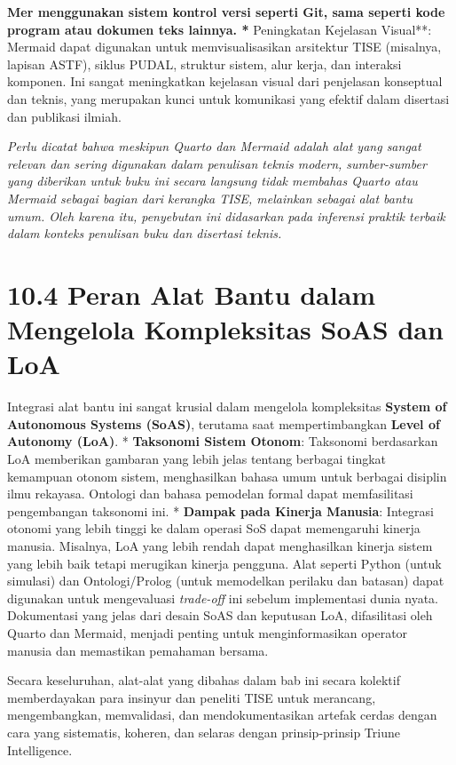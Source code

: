 \documentclass[
  letterpaper,
  DIV=11,
  numbers=noendperiod]{scrreprt}
\begin{document}
\textbf{Mer menggunakan sistem kontrol versi seperti Git, sama seperti
kode program atau dokumen teks lainnya. * }Peningkatan Kejelasan
Visual**: Mermaid dapat digunakan untuk memvisualisasikan arsitektur
TISE (misalnya, lapisan ASTF), siklus PUDAL, struktur sistem, alur
kerja, dan interaksi komponen. Ini sangat meningkatkan kejelasan visual
dari penjelasan konseptual dan teknis, yang merupakan kunci untuk
komunikasi yang efektif dalam disertasi dan publikasi ilmiah.

\emph{Perlu dicatat bahwa meskipun Quarto dan Mermaid adalah alat yang
sangat relevan dan sering digunakan dalam penulisan teknis modern,
sumber-sumber yang diberikan untuk buku ini secara langsung tidak
membahas Quarto atau Mermaid sebagai bagian dari kerangka TISE,
melainkan sebagai alat bantu umum. Oleh karena itu, penyebutan ini
didasarkan pada inferensi praktik terbaik dalam konteks penulisan buku
dan disertasi teknis.}

\section{\texorpdfstring{\textbf{10.4 Peran Alat Bantu dalam Mengelola
Kompleksitas SoAS dan
LoA}}{10.4 Peran Alat Bantu dalam Mengelola Kompleksitas SoAS dan LoA}}\label{peran-alat-bantu-dalam-mengelola-kompleksitas-soas-dan-loa}

Integrasi alat bantu ini sangat krusial dalam mengelola kompleksitas
\textbf{System of Autonomous Systems (SoAS)}, terutama saat
mempertimbangkan \textbf{Level of Autonomy (LoA)}. * \textbf{Taksonomi
Sistem Otonom}: Taksonomi berdasarkan LoA memberikan gambaran yang lebih
jelas tentang berbagai tingkat kemampuan otonom sistem, menghasilkan
bahasa umum untuk berbagai disiplin ilmu rekayasa. Ontologi dan bahasa
pemodelan formal dapat memfasilitasi pengembangan taksonomi ini. *
\textbf{Dampak pada Kinerja Manusia}: Integrasi otonomi yang lebih
tinggi ke dalam operasi SoS dapat memengaruhi kinerja manusia. Misalnya,
LoA yang lebih rendah dapat menghasilkan kinerja sistem yang lebih baik
tetapi merugikan kinerja pengguna. Alat seperti Python (untuk simulasi)
dan Ontologi/Prolog (untuk memodelkan perilaku dan batasan) dapat
digunakan untuk mengevaluasi \emph{trade-off} ini sebelum implementasi
dunia nyata. Dokumentasi yang jelas dari desain SoAS dan keputusan LoA,
difasilitasi oleh Quarto dan Mermaid, menjadi penting untuk
menginformasikan operator manusia dan memastikan pemahaman bersama.

Secara keseluruhan, alat-alat yang dibahas dalam bab ini secara kolektif
memberdayakan para insinyur dan peneliti TISE untuk merancang,
mengembangkan, memvalidasi, dan mendokumentasikan artefak cerdas dengan
cara yang sistematis, koheren, dan selaras dengan prinsip-prinsip Triune
Intelligence.
\end{document}
